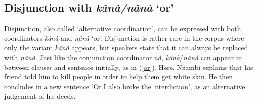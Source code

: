 





\subsection{Disjunction with {\itshape kânà/nânà} `or'}
\label{sec:Disjunction}

Disjunction, also called `alternative coordination', can be expressed with both coordinators {\itshape kânà} and {\itshape nânà} `or'. Disjunction is rather rare in the corpus where only the variant {\itshape kânà} appears, but speakers state that it can always be replaced with {\itshape nânà}. Just like the conjunction coordinator {\itshape nà}, {\itshape kânà}/{\itshape nânà} can appear in between clauses and sentence initially, as in (\ref{or}). Here, Nzambi explains that his friend told him to kill people in order to help them get white skin. He then concludes in a new sentence `Or I also broke the interdiction', as an alternative judgement of his deeds.

